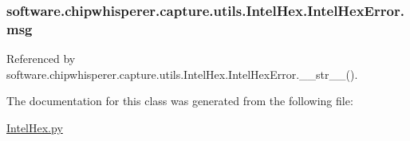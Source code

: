 \subsubsection[{msg}]{\setlength{\rightskip}{0pt plus 5cm}software.\+chipwhisperer.\+capture.\+utils.\+Intel\+Hex.\+Intel\+Hex\+Error.\+msg}\label{classsoftware_1_1chipwhisperer_1_1capture_1_1utils_1_1IntelHex_1_1IntelHexError_a2739ad20fcbaaf748aa001eea62793f3}


Referenced by software.\+chipwhisperer.\+capture.\+utils.\+Intel\+Hex.\+Intel\+Hex\+Error.\+\_\+\+\_\+str\+\_\+\+\_\+().



The documentation for this class was generated from the following file\+:\begin{DoxyCompactItemize}
\item 
\hyperlink{IntelHex_8py}{Intel\+Hex.\+py}\end{DoxyCompactItemize}
